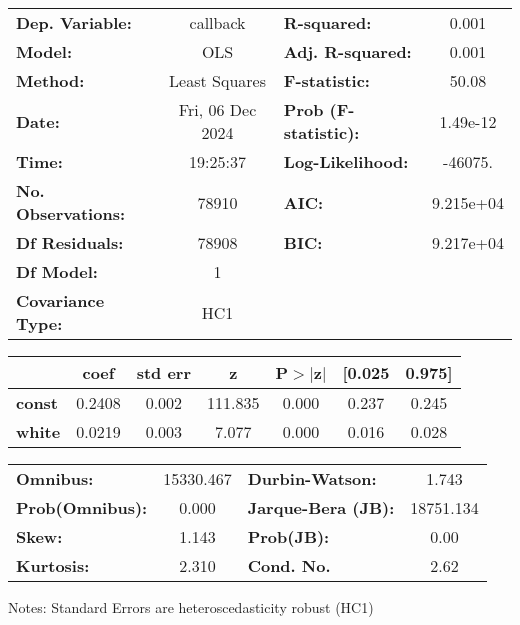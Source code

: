 \begin{center}
\begin{tabular}{lclc}
\toprule
\textbf{Dep. Variable:}    &     callback     & \textbf{  R-squared:         } &     0.001   \\
\textbf{Model:}            &       OLS        & \textbf{  Adj. R-squared:    } &     0.001   \\
\textbf{Method:}           &  Least Squares   & \textbf{  F-statistic:       } &     50.08   \\
\textbf{Date:}             & Fri, 06 Dec 2024 & \textbf{  Prob (F-statistic):} &  1.49e-12   \\
\textbf{Time:}             &     19:25:37     & \textbf{  Log-Likelihood:    } &   -46075.   \\
\textbf{No. Observations:} &       78910      & \textbf{  AIC:               } & 9.215e+04   \\
\textbf{Df Residuals:}     &       78908      & \textbf{  BIC:               } & 9.217e+04   \\
\textbf{Df Model:}         &           1      & \textbf{                     } &             \\
\textbf{Covariance Type:}  &       HC1        & \textbf{                     } &             \\
\bottomrule
\end{tabular}
\begin{tabular}{lcccccc}
               & \textbf{coef} & \textbf{std err} & \textbf{z} & \textbf{P$> |$z$|$} & \textbf{[0.025} & \textbf{0.975]}  \\
\midrule
\textbf{const} &       0.2408  &        0.002     &   111.835  &         0.000        &        0.237    &        0.245     \\
\textbf{white} &       0.0219  &        0.003     &     7.077  &         0.000        &        0.016    &        0.028     \\
\bottomrule
\end{tabular}
\begin{tabular}{lclc}
\textbf{Omnibus:}       & 15330.467 & \textbf{  Durbin-Watson:     } &     1.743  \\
\textbf{Prob(Omnibus):} &    0.000  & \textbf{  Jarque-Bera (JB):  } & 18751.134  \\
\textbf{Skew:}          &    1.143  & \textbf{  Prob(JB):          } &      0.00  \\
\textbf{Kurtosis:}      &    2.310  & \textbf{  Cond. No.          } &      2.62  \\
\bottomrule
\end{tabular}
\end{center}

Notes: \newline
 [1] Standard Errors are heteroscedasticity robust (HC1)